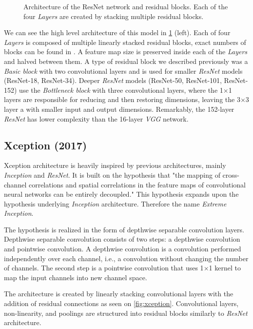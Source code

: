 \begin{figure}
    \resnetArch
    \caption{Architecture of the ResNet network and residual blocks. Each of the four \textit{Layers} are created by stacking multiple residual blocks.}
    \label{fig:resnet_arch}
\end{figure}

We can see the high level architecture of this model in \cref{fig:resnet_arch} (left). Each of four \textit{Layers} is composed of multiple linearly stacked residual blocks, exact numbers of blocks can be found in \cite[table 1]{bib:resnet}. A feature map size is preserved inside each of the \textit{Layers} and halved between them. A type of residual block we described previously was a \textit{Basic block} with two convolutional layers and is used for smaller \textit{ResNet} models (ResNet-18, ResNet-34). Deeper \textit{ResNet} models (ResNet-50, ResNet-101, ResNet-152) use the \textit{Bottleneck block} with three convolutional layers, where the 1$\times$1 layers are responsible for reducing and then restoring dimensions, leaving the 3$\times$3 layer a with smaller input and output dimensions. Remarkably, the 152-layer \textit{ResNet} has lower complexity than the 16-layer \textit{VGG} network.



\subsection{Xception (2017)}
\label{sec:xception}
Xception architecture \cite{bib:xception} is heavily inspired by previous architectures, mainly \textit{Inception} and \textit{ResNet}. It is built on the hypothesis that "the mapping of cross-channel correlations and spatial correlations in the feature maps of convolutional neural networks can be entirely decoupled." This hypothesis expands upon the hypothesis underlying \textit{Inception} architecture. Therefore the name \textit{Extreme Inception}. 

The hypothesis is realized in the form of depthwise separable convolution layers. Depthwise separable convolution consists of two steps: a depthwise convolution and pointwise convolution. A depthwise convolution is a convolution performed independently over each channel, i.e., a convolution without changing the number of channels. The second step is a pointwise convolution that uses 1$\times$1 kernel to map the input channels into new channel space.

The architecture is created by linearly stacking convolutional layers with the addition of residual connections as seen on \cref{fig:xception}. Convolutional layers, non-linearity, and poolings are structured into residual blocks similarly to \textit{ResNet} architecture.

